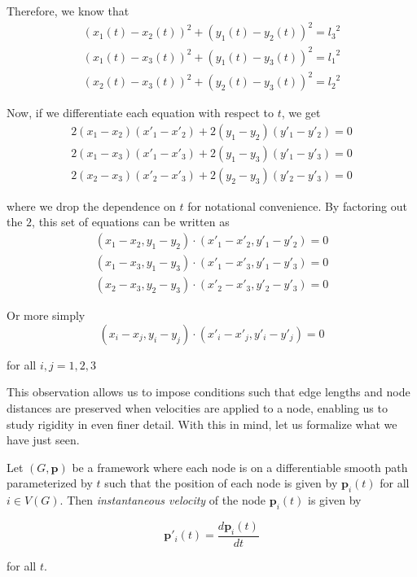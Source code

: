 \begin{flushleft}
Therefore, we know that 
\vspace{-1 mm}
\[
\begin{split}
(x_1(t) - x_2(t))^2 + (y_1(t) - y_2(t))^2 = {l_3}^2 \\
(x_1(t) - x_3(t))^2 + (y_1(t) - y_3(t))^2 = {l_1}^2 \\
(x_2(t) - x_3(t))^2 + (y_2(t) - y_3(t))^2 = {l_2}^2
\end{split}
\]

Now, if we differentiate each equation with respect to $t$, we get 
\vspace{-1 mm}
\[
\begin{split}
2(x_1 - x_2)(x'_1 - x'_2) + 2(y_1 - y_2)(y'_1 - y'_2) = 0 \\
2(x_1 - x_3)(x'_1 - x'_3) + 2(y_1 - y_3)(y'_1 - y'_3) = 0 \\
2(x_2 - x_3)(x'_2 - x'_3) + 2(y_2 - y_3)(y'_2 - y'_3) = 0
\end{split}
\]

where we drop the dependence on $t$ for notational convenience. By factoring out the $2$, this set of equations can be written as
\vspace{-1 mm}
\[
\begin{split}
(x_1 - x_2, y_1 - y_2) \cdot (x'_1 - x'_2, y'_1 - y'_2) = 0 \\
(x_1 - x_3, y_1 - y_3) \cdot (x'_1 - x'_3, y'_1 - y'_3) = 0 \\
(x_2 - x_3, y_2 - y_3) \cdot (x'_2 - x'_3, y'_2 - y'_3) = 0
\end{split}
\]

Or more simply
\[
(x_i - x_j, y_i - y_j) \cdot (x'_i - x'_j, y'_i - y'_j) = 0
\]

for all $i,j = 1,2,3$
\end{flushleft}

\begin{flushleft}
This observation allows us to impose conditions such that edge lengths and node distances are preserved when velocities are applied to a node, enabling us to study rigidity in even finer detail. With this in mind, let us formalize what we have just seen.
\end{flushleft}

\begin{definition}
Let $(G,\mathbf{p})$ be a framework where each node is on a differentiable smooth path parameterized by $t$ such that the position of each node is given by $\mathbf{p}_i(t)$ for all $i \in  V(G)$. Then \textit{instantaneous velocity} of the node $\mathbf{p}_i(t)$ is given by

\[
\mathbf{p}'_i(t) = \frac{d\mathbf{p}_i(t)}{dt}
\]

\noindent
for all $t$.
\end{definition} 

